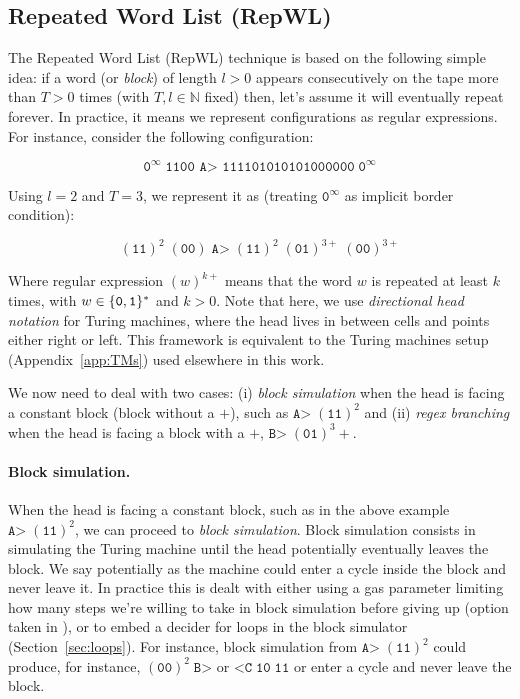 
\newpage
\subsection{Repeated Word List (RepWL)}\label{sec:RepWL}

The Repeated Word List (RepWL) technique is based on the following simple idea: if a word (or \textit{block}) of length $l > 0$ appears consecutively on the tape more than $T > 0$ times (with $T, l \in \mathbb{N}$ fixed) then, let's assume it will eventually repeat forever. In practice, it means we represent configurations as regular expressions. For instance, consider the following configuration:

$$ \texttt{0}^\infty \; \texttt{1100 A> 111101010101000000} \; \texttt{0}^\infty$$

Using $l=2$ and $T = 3$, we represent it as (treating $\texttt{0}^\infty$ as implicit border condition):

$$ (\texttt{11})^2 \; (\texttt{00}) \; \texttt{A>} \; (\texttt{11})^2 \; (\texttt{01})^{3+} \; (\texttt{00})^{3+}$$

Where regular expression $(w)^{k+}$ means that the word $w$ is repeated at least $k$ times, with $w \in \{\texttt{0},\texttt{1}\}^*$ and $k > 0$. Note that here, we use \textit{directional head notation} for Turing machines, where the head lives in between cells and points either right or left. This framework is equivalent to the Turing machines setup (Appendix~\ref{app:TMs}) used elsewhere in this work.

We now need to deal with two cases: (i) \textit{block simulation} when the head is facing a constant block (\ie block without a $+$), such as $\texttt{A>} \; (\texttt{11})^2$ and (ii) \textit{regex branching} when the head is facing a block with a $+$, \eg $\texttt{B>} \; (\texttt{01})^3+$.

\paragraph{Block simulation.} When the head is facing a constant block, such as in the above example $\texttt{A>} \; (\texttt{11})^2$, we can proceed to \textit{block simulation}. Block simulation consists in simulating the Turing machine until the head potentially eventually leaves the block. We say potentially as the machine could enter a cycle inside the block and never leave it. In practice this is dealt with either using a gas parameter limiting how many steps we're willing to take in block simulation before giving up (option taken in \CoqBB), or to embed a decider for loops in the block simulator (Section~\ref{sec:loops}). For instance, block simulation from $\texttt{A>} \; (\texttt{11})^2$ could produce, for instance, $(\texttt{00})^2 \; \texttt{B>}$ or $\texttt{<C} \; \texttt{10} \; \texttt{11} $ or enter a cycle and never leave the block.

